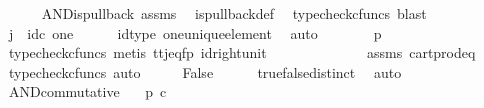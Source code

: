 \begin{isabellebody}
\ \ \ \ \isamarkupfalse%
\ AND{\isacharunderscore}{\kern0pt}is{\isacharunderscore}{\kern0pt}pullback\ assms\ \isamarkupfalse%
\ is{\isacharunderscore}{\kern0pt}pullback{\isacharunderscore}{\kern0pt}def\ \isamarkupfalse%
\ {\isacharparenleft}{\kern0pt}typecheck{\isacharunderscore}{\kern0pt}cfuncs{\isacharcomma}{\kern0pt}\ blast{\isacharparenright}{\kern0pt}\isanewline
\ \ \isamarkupfalse%
\ \isamarkupfalse%
\ {\isachardoublequoteopen}j\ {\isacharequal}{\kern0pt}\ id\isactrlsub c\ one{\isachardoublequoteclose}\isanewline
\ \ \ \ \isamarkupfalse%
\ id{\isacharunderscore}{\kern0pt}type\ one{\isacharunderscore}{\kern0pt}unique{\isacharunderscore}{\kern0pt}element\ \isamarkupfalse%
\ auto\isanewline
\ \ \isamarkupfalse%
\ \isamarkupfalse%
\ {\isachardoublequoteopen}{\isasymlangle}{\isasymt}{\isacharcomma}{\kern0pt}{\isasymt}{\isasymrangle}\ {\isacharequal}{\kern0pt}\ {\isasymlangle}p{\isacharcomma}{\kern0pt}{\isasymf}{\isasymrangle}{\isachardoublequoteclose}\isanewline
\ \ \ \ \isamarkupfalse%
\ {\isacharparenleft}{\kern0pt}typecheck{\isacharunderscore}{\kern0pt}cfuncs{\isacharcomma}{\kern0pt}\ metis\ tt{\isacharunderscore}{\kern0pt}j{\isacharunderscore}{\kern0pt}eq{\isacharunderscore}{\kern0pt}fp\ id{\isacharunderscore}{\kern0pt}right{\isacharunderscore}{\kern0pt}unit{}{\isacharparenright}{\kern0pt}\isanewline
\ \ \isamarkupfalse%
\ \isamarkupfalse%
\ {\isachardoublequoteopen}{\isasymt}\ {\isacharequal}{\kern0pt}\ {\isasymf}{\isachardoublequoteclose}\isanewline
\ \ \ \ \isamarkupfalse%
\ assms\ cart{\isacharunderscore}{\kern0pt}prod{\isacharunderscore}{\kern0pt}eq{}\ \isamarkupfalse%
\ {\isacharparenleft}{\kern0pt}typecheck{\isacharunderscore}{\kern0pt}cfuncs{\isacharcomma}{\kern0pt}\ auto{\isacharparenright}{\kern0pt}\isanewline
\ \ \isamarkupfalse%
\ \isamarkupfalse%
\ {\isachardoublequoteopen}False{\isachardoublequoteclose}\isanewline
\ \ \ \ \isamarkupfalse%
\ true{\isacharunderscore}{\kern0pt}false{\isacharunderscore}{\kern0pt}distinct\ \isamarkupfalse%
\ auto\isanewline
{}\isamarkupfalse%
%
\endisatagproof
{\isafoldproof}%
%
\isadelimproof
\isanewline
%
\endisadelimproof
\isanewline
{}\isamarkupfalse%
\ AND{\isacharunderscore}{\kern0pt}commutative{\isacharcolon}{\kern0pt}\isanewline
\ \ \ {\isachardoublequoteopen}p\ {\isasymin}\isactrlsub c\ {\isasymOmega}{\isachardoublequoteclose}\isanewline

\end{isabellebody}
